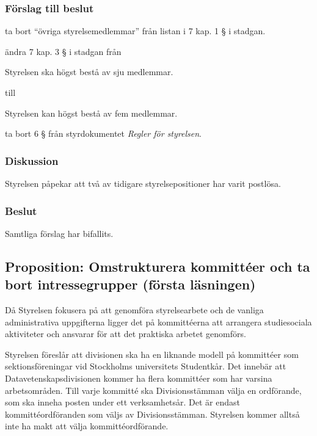 \documentclass[protokoll]{dvd}
\begin{document}
\subsubsection*{Förslag till beslut}

\begin{attsatser}
	\item ta bort ``övriga styrelsemedlemmar'' från listan i 7 kap. 1 § i stadgan.
	\item ändra 7 kap. 3 § i stadgan från

	\begin{displayquote}
		Styrelsen ska högst bestå av sju medlemmar.
	\end{displayquote}

	till

	\begin{displayquote}
		Styrelsen kan högst bestå av fem medlemmar.
	\end{displayquote}

	\item ta bort 6 § från styrdokumentet \emph{Regler för styrelsen}.
\end{attsatser}

\subsubsection{Diskussion}
Styrelsen påpekar att två av tidigare styrelsepositioner har varit postlösa.

\subsubsection{Beslut}
\begin{attsatser}
	\item Samtliga förslag har bifallits.
\end{attsatser}


\newpage
\subsection{Proposition: Omstrukturera kommittéer och ta bort intressegrupper (första läsningen)}

Då Styrelsen fokusera på att genomföra styrelsearbete och de vanliga administrativa uppgifterna ligger det på kommittéerna att arrangera studiesociala aktiviteter och ansvarar för att det praktiska arbetet genomförs.

Styrelsen föreslår att divisionen ska ha en liknande modell på kommittéer som sektionsföreningar vid Stockholms universitets Studentkår.
Det innebär att Datavetenskapsdivisionen kommer ha flera kommittéer som har varsina arbetsområden.
Till varje kommitté ska Divisionsstämman välja en ordförande, som ska inneha posten under ett verksamhetsår.
Det är endast kommittéordföranden som väljs av Divisionsstämman.
Styrelsen kommer alltså inte ha makt att välja kommittéordförande.
\end{document}
